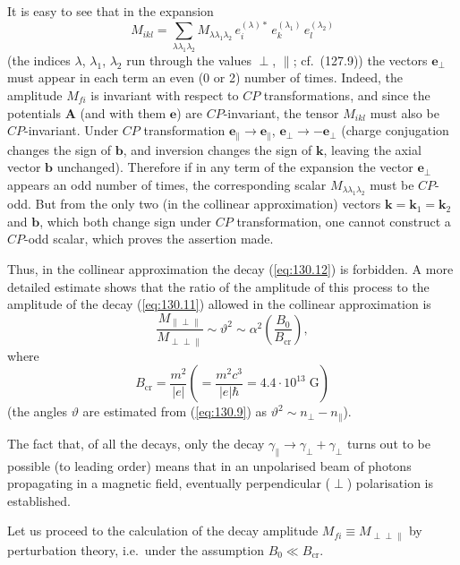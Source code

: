 
It is easy to see that in the expansion
\[
M_{ikl} = \sum_{\lambda\lambda_1\lambda_2} M_{\lambda\lambda_1\lambda_2}\,e_i^{(\lambda)*}\,e_k^{(\lambda_1)}\,e_l^{(\lambda_2)}
\]
(the indices $\lambda$, $\lambda_1$, $\lambda_2$ run through the values $\perp$, $\parallel$; cf.\ (127.9)) the vectors $\mathbf{e}_\perp$ must appear in each term an even (0 or 2) number of times. Indeed, the amplitude $M_{fi}$ is invariant with respect to $CP$ transformations, and since the potentials $\mathbf{A}$ (and with them $\mathbf{e}$) are $CP$-invariant, the tensor $M_{ikl}$ must also be $CP$-invariant. Under $CP$ transformation $\mathbf{e}_\parallel \to \mathbf{e}_\parallel$, $\mathbf{e}_\perp \to -\mathbf{e}_\perp$ (charge conjugation changes the sign of $\mathbf{b}$, and inversion changes the sign of $\mathbf{k}$, leaving the axial vector $\mathbf{b}$ unchanged). Therefore if in any term of the expansion the vector $\mathbf{e}_\perp$ appears an odd number of times, the corresponding scalar $M_{\lambda\lambda_1\lambda_2}$ must be $CP$-odd. But from the only two (in the collinear approximation) vectors $\mathbf{k} = \mathbf{k}_1 = \mathbf{k}_2$ and $\mathbf{b}$, which both change sign under $CP$ transformation, one cannot construct a $CP$-odd scalar, which proves the assertion made.

Thus, in the collinear approximation the decay (\ref{eq:130.12}) is forbidden. A more detailed estimate shows that the ratio of the amplitude of this process to the amplitude of the decay (\ref{eq:130.11}) allowed in the collinear approximation is
\begin{equation}
\frac{M_{\parallel\perp\parallel}}{M_{\perp\perp\parallel}} \sim \vartheta^2 \sim \alpha^2\left(\frac{B_0}{B_{\text{cr}}}\right),
\label{eq:130.14}
\end{equation}
where
\[
B_{\text{cr}} = \frac{m^2}{|e|}\left(= \frac{m^2c^3}{|e|\hbar} = 4.4\cdot 10^{13}\;\text{G}\right)
\]
(the angles $\vartheta$ are estimated from (\ref{eq:130.9}) as $\vartheta^2 \sim n_\perp - n_\parallel$).

The fact that, of all the decays, only the decay $\gamma_\parallel \to \gamma_\perp + \gamma_\perp$ turns out to be possible (to leading order) means that in an unpolarised beam of photons propagating in a magnetic field, eventually perpendicular ($\perp$) polarisation is established.

Let us proceed to the calculation of the decay amplitude $M_{fi} \equiv M_{\perp\perp\parallel}$ by perturbation theory, i.e.\ under the assumption $B_0 \ll B_{\text{cr}}$.

